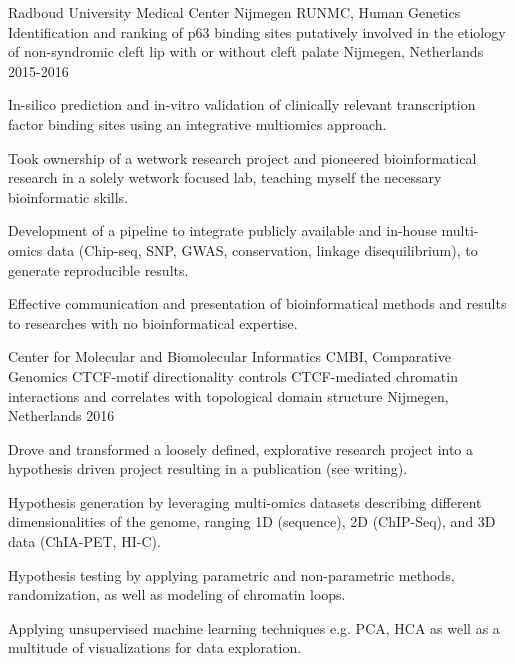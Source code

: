 

\begin{cventries}

  \cventry
    {Radboud University Medical Center Nijmegen RUNMC, Human Genetics} %
    {Identification and ranking of p63 binding sites putatively involved in the etiology of non-syndromic cleft lip with or without cleft palate} %
    {Nijmegen, Netherlands} %
    {2015-2016} %
    { 
      \begin{cvitems} %
        \item {In-silico prediction and in-vitro validation of clinically relevant transcription factor binding sites using an integrative multiomics approach.}
        \item {Took ownership of a wetwork research project and pioneered bioinformatical research in a solely wetwork focused lab, teaching myself the necessary bioinformatic skills.}
        \item {Development of a pipeline to integrate publicly available and in-house multi-omics data (Chip-seq, SNP, GWAS, conservation, linkage disequilibrium), to generate reproducible results.}
        \item {Effective communication and presentation of bioinformatical methods and results to researches with no bioinformatical expertise.}
      \end{cvitems}
    }

  \cventry
    {Center for Molecular and Biomolecular Informatics CMBI, Comparative Genomics} %
    {CTCF-motif directionality controls CTCF-mediated chromatin interactions and correlates with topological domain structure} %
    {Nijmegen, Netherlands} %
    {2016} %
    {
      \begin{cvitems} %
        \item {Drove and transformed a loosely defined, explorative research project into a hypothesis driven project resulting in a publication (see writing).}
        \item {Hypothesis generation by leveraging multi-omics datasets describing different dimensionalities of the genome, ranging 1D (sequence), 2D (ChIP-Seq), and 3D data (ChIA-PET, HI-C).}
        \item {Hypothesis testing by applying parametric and non-parametric methods, randomization, as well as modeling of chromatin loops.}
        \item {Applying unsupervised machine learning techniques e.g. PCA, HCA as well as a multitude of visualizations for data exploration.}
      \end{cvitems}
    }


\end{cventries}
